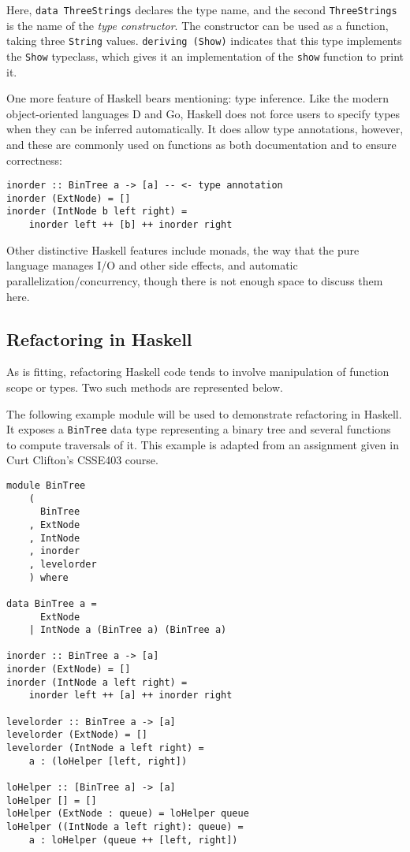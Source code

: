 \noindent Here, \verb!data ThreeStrings! declares the type name, and the second \verb!ThreeStrings! is the name of the \textit{type constructor}.  The constructor can be used as a function, taking three \verb!String! values.  \verb!deriving (Show)! indicates that this type implements the \verb!Show! typeclass, which gives it an implementation of the \verb!show! function to print it.

One more feature of Haskell bears mentioning: type inference.  Like the modern object-oriented languages D and Go, Haskell does not force users to specify types when they can be inferred automatically.  It does allow type annotations, however, and these are commonly used on functions as both documentation and to ensure correctness:

\begin{verbatim}
inorder :: BinTree a -> [a] -- <- type annotation
inorder (ExtNode) = []
inorder (IntNode b left right) =
    inorder left ++ [b] ++ inorder right
\end{verbatim}

Other distinctive Haskell features include monads, the way that the pure language manages I/O and other side effects, and automatic parallelization/concurrency, though there is not enough space to discuss them here.

\subsection{Refactoring in Haskell}

As is fitting, refactoring Haskell code tends to involve manipulation of function scope or types.  Two such methods are represented below.

The following example module will be used to demonstrate refactoring in Haskell.  It exposes a \verb!BinTree! data type representing a binary tree and several functions to compute traversals of it.  This example is adapted from an assignment given in Curt Clifton's CSSE403 course\cite{clifton2010}.

\begin{verbatim}
module BinTree
    (
      BinTree
    , ExtNode
    , IntNode
    , inorder
    , levelorder
    ) where

data BinTree a =
      ExtNode
    | IntNode a (BinTree a) (BinTree a)

inorder :: BinTree a -> [a]
inorder (ExtNode) = []
inorder (IntNode a left right) =
    inorder left ++ [a] ++ inorder right

levelorder :: BinTree a -> [a]
levelorder (ExtNode) = []
levelorder (IntNode a left right) =
    a : (loHelper [left, right])

loHelper :: [BinTree a] -> [a]
loHelper [] = []
loHelper (ExtNode : queue) = loHelper queue
loHelper ((IntNode a left right): queue) =
    a : loHelper (queue ++ [left, right])
\end{verbatim}

